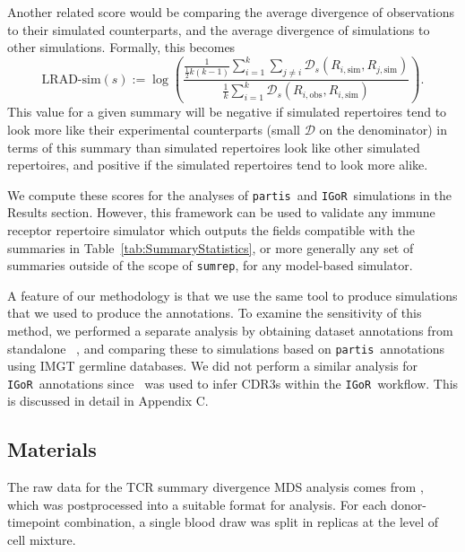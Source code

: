 \documentclass{article}
\newcommand{\partis}{\texttt{partis}}
\newcommand{\igor}{\texttt{IGoR}}
\newcommand{\igblast}{\text{IgBlast}}
\begin{document}
Another related score would be comparing the average divergence of observations to their simulated counterparts, and the average divergence of simulations to other simulations.
Formally, this becomes
\begin{equation}\label{eq:ScoreSim}
    \text{LRAD-sim}(s) :=
    \log \left(
        \frac{
            \frac{1}{\frac{1}{2} k\left(k - 1\right)}
            \sum_{i=1}^{k}
            \sum_{j \ne i}
                \mathcal D_s\left(R_{i, \text{sim}}, R_{j, \text{sim}}\right)
        }
        {
            \frac{1}{k}
            \sum_{i = 1}^k
                \mathcal D_s \left( R_{i, \text{obs}}, R_{i, \text{sim}}\right)
        }
    \right).
\end{equation}
This value for a given summary will be negative if simulated repertoires tend to look more like their experimental counterparts (small $\mathcal D$ on the denominator) in terms of this summary than simulated repertoires look like other simulated repertoires, and positive if the simulated repertoires tend to look more alike.

We compute these scores for the analyses of \partis\ and \igor\ simulations in the Results section.
However, this framework can be used to validate any immune receptor repertoire simulator which outputs the fields compatible with the summaries in Table~\ref{tab:SummaryStatistics}, or more generally any set of summaries outside of the scope of \texttt{sumrep}, for any model-based simulator.

A feature of our methodology is that we use the same tool to produce simulations that we used to produce the annotations.
To examine the sensitivity of this method, we performed a separate analysis by obtaining dataset annotations from standalone \igblast~\cite{Ye2013-kl}, and comparing these to simulations based on \partis\ annotations using IMGT germline databases.
We did not perform a similar analysis for \igor\ annotations since \igblast\ was used to infer CDR3s within the \igor\ workflow.
This is discussed in detail in Appendix C.


\subsection*{Materials}
The raw data for the TCR summary divergence MDS analysis comes from \cite{Pogorelyy2018-ak}, which was postprocessed into a suitable format for analysis.
For each donor-timepoint combination, a single blood draw was split in replicas at the level of cell mixture.
\end{document}
